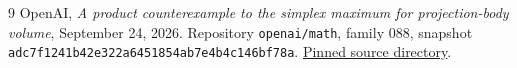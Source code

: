 \documentclass[11pt]{article}
\theoremstyle{remark}\newtheorem{remark}[theorem]{Remark}
\begin{document}
\begin{thebibliography}{9}
 OpenAI, \emph{A product counterexample to the simplex maximum for projection-body volume}, September 24, 2026. Repository \texttt{openai/math}, family 088, snapshot \texttt{adc7f1241b42e322a6451854ab7e4b4c146bf78a}. \href{https://github.com/openai/math/tree/adc7f1241b42e322a6451854ab7e4b4c146bf78a/preprints/A-product-counterexample-to-the-simplex-maximum-for-projection-body-volume-September-24-2026}{Pinned source directory}.
\end{thebibliography}
\end{document}
